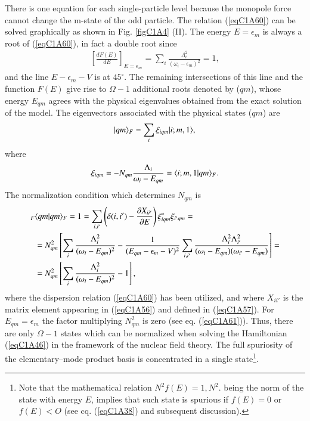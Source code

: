  There is one equation for each single-particle level because the monopole force cannot change the m-state of the odd particle. The relation (\ref{eqC1A60}) can be solved graphically as shown in Fig. \ref{figC1A4} (II). The energy $E =\epsilon_m$ is always a root of (\ref{eqC1A60}), in fact a double root since 
  \begin{align}\label{eqC1A61} 
 \left[\frac{dF(E)}{dE}\right]_{E=\epsilon_m}=\sum_i\frac{\Lambda^2_i}{\left(\omega_i-\epsilon_m\right)^2}=1,
  \end{align}
and the line $E-\epsilon_m-V$ is at $45^\circ$. The remaining intersections of this line and the function $F(E)$ give rise to $\Omega-1$ additional roots denoted by ($qm$), whose energy $E_{qm}$ agrees with the physical eigenvalues obtained from the exact solution of the model. 
The eigenvectors associated with the physical states ($qm$) are 
  \begin{align}\label{eqC1A62} 
 |{qm} \rangle_F=\sum_i\xi_{iqm}|{i;m,1} \rangle,
  \end{align}
where 
  \begin{align}\label{eqC1A63} 
 \xi_{iqm}=-N_{qm}\frac{\Lambda_i}{\omega_i-E_{qm}}=\langle {i;m,1|qm} \rangle_F.
  \end{align}
The normalization condition which determines $N_{qm}$ is   \begin{align}\label{eqC1A64} 
\nonumber _F&\langle {qm|qm} \rangle_F=1=\sum_{i,i'}\left(\delta(i,i')-\frac{\partial X_{ii'}}{\partial E}\right)\xi^*_{iqm}\xi_{i'qm}=\\
\nonumber &=N^2_{qm}\left[\sum_i\frac{\Lambda^2_i}{(\omega_i-E_{qm})^2}-\frac{1}{(E_{qm}-\epsilon_m-V)^2}\sum_{i,i'}\frac{\Lambda^2_i\Lambda^2_{i'}}{(\omega_i-E_{qm})(\omega_{i'}-E_{qm})}\right]=\\
 &=N^2_{qm}\left[\sum_i\frac{\Lambda_i^2}{(\omega_i-E_{qm})^2}-1\right],
  \end{align}
where the dispersion relation (\ref{eqC1A60}) has been utilized, and where $X_{ii'}$ is the matrix element appearing in (\ref{eqC1A56}) and defined in (\ref{eqC1A57}). For $E_{qm}=\epsilon_m$ the factor multiplying $N^2_{qm}$ is zero (see eq. (\ref{eqC1A61})). Thus, there are only $\Omega-1$ states which can be normalized when solving the Hamiltonian (\ref{eqC1A46}) in the framework of the nuclear field theory. The full spuriosity of the elementary--mode product basis is concentrated in a single state\footnote{ Note that the mathematical relation $N^2f(E)=1, N^2$. being the norm of the state with energy $E$, implies that such state is spurious if $f(E)= 0$ or $f(E)<O$ (see cq. (\ref{eqC1A38}) and subsequent discussion).}.

